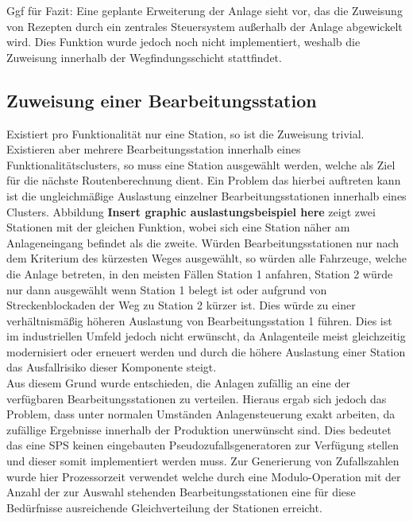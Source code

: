 			Ggf für Fazit: Eine geplante Erweiterung der Anlage sieht vor, das die Zuweisung von Rezepten durch ein zentrales Steuersystem außerhalb der Anlage abgewickelt wird. Dies Funktion wurde jedoch noch nicht implementiert, weshalb die Zuweisung innerhalb der Wegfindungsschicht stattfindet.
			
		
		\subsection{Zuweisung einer Bearbeitungsstation}
			\label{Zuweisung_Station}
			Existiert pro Funktionalität nur eine Station, so ist die Zuweisung trivial. Existieren aber mehrere Bearbeitungsstation innerhalb eines Funktionalitätsclusters, so muss eine Station ausgewählt werden, welche als Ziel für die nächste Routenberechnung dient. Ein Problem das hierbei auftreten kann ist die ungleichmäßige Auslastung einzelner Bearbeitungsstationen innerhalb eines Clusters. Abbildung \textbf{Insert graphic auslastungsbeispiel here} zeigt zwei Stationen mit der gleichen Funktion, wobei sich eine Station näher am Anlageneingang befindet als die zweite. Würden Bearbeitungsstationen nur nach dem Kriterium des kürzesten Weges ausgewählt, so würden alle Fahrzeuge, welche die Anlage betreten, in den meisten Fällen Station 1 anfahren, Station 2 würde nur dann ausgewählt wenn Station 1 belegt ist oder aufgrund von Streckenblockaden der Weg zu Station 2 kürzer ist. Dies würde zu einer verhältnismäßig höheren Auslastung von Bearbeitungsstation 1 führen. Dies ist im industriellen Umfeld jedoch nicht erwünscht, da Anlagenteile meist gleichzeitig modernisiert oder erneuert werden und durch die höhere Auslastung einer Station das Ausfallrisiko dieser Komponente steigt.\\
			
			Aus diesem Grund wurde entschieden, die Anlagen zufällig an eine der verfügbaren Bearbeitungsstationen zu verteilen. Hieraus ergab sich jedoch das Problem, dass unter normalen Umständen Anlagensteuerung exakt arbeiten, da zufällige Ergebnisse innerhalb der Produktion unerwünscht sind. Dies bedeutet das eine \ac{SPS} keinen eingebauten Pseudozufallsgeneratoren zur Verfügung stellen und dieser somit implementiert werden muss. Zur Generierung von Zufallszahlen wurde hier Prozessorzeit verwendet welche durch eine Modulo-Operation mit der Anzahl der zur Auswahl stehenden Bearbeitungsstationen eine für diese Bedürfnisse ausreichende Gleichverteilung der Stationen erreicht.
		
